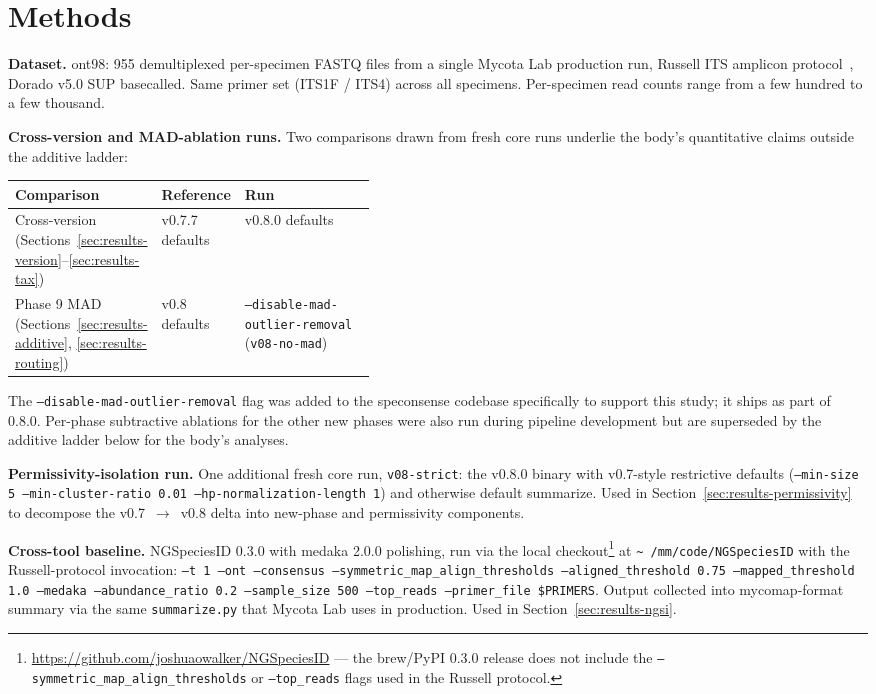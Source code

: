 \documentclass[11pt]{article}
\begin{document}
\section{Methods}
\label{sec:methods}

\textbf{Dataset.} ont98: 955 demultiplexed per-specimen FASTQ files from a
single Mycota Lab production run, Russell ITS amplicon
protocol~\cite{russell2023}, Dorado v5.0 SUP basecalled. Same primer set
(ITS1F / ITS4) across all specimens. Per-specimen read counts range from a
few hundred to a few thousand.

\textbf{Cross-version and MAD-ablation runs.} Two comparisons drawn
from fresh core runs underlie the body's quantitative claims outside
the additive ladder:

\begin{center}
\begin{tabular}{l l p{0.42\linewidth}}
\toprule
Comparison & Reference & Run \\
\midrule
Cross-version (Sections~\ref{sec:results-version}--\ref{sec:results-tax})
  & v0.7.7 defaults & v0.8.0 defaults \\
Phase 9 MAD (Sections~\ref{sec:results-additive}, \ref{sec:results-routing})
  & v0.8 defaults & \texttt{--disable-mad-outlier-removal} (\texttt{v08-no-mad}) \\
\bottomrule
\end{tabular}
\end{center}

The \texttt{--disable-mad-outlier-removal} flag was added to the
speconsense codebase specifically to support this study; it ships as
part of 0.8.0. Per-phase subtractive ablations for the other new phases
were also run during pipeline development but are superseded by the
additive ladder below for the body's analyses.

\textbf{Permissivity-isolation run.} One additional fresh core run,
\texttt{v08-strict}: the v0.8.0 binary with v0.7-style restrictive
defaults (\texttt{--min-size 5 --min-cluster-ratio 0.01
--hp-normalization-length 1}) and otherwise default summarize. Used in
Section~\ref{sec:results-permissivity} to decompose the v0.7~$\to$~v0.8
delta into new-phase and permissivity components.

\textbf{Cross-tool baseline.} NGSpeciesID 0.3.0 with medaka 2.0.0
polishing, run via the local
checkout\footnote{\url{https://github.com/joshuaowalker/NGSpeciesID} ---
the brew/PyPI 0.3.0 release does not include the
\texttt{--symmetric\_map\_align\_thresholds} or \texttt{--top\_reads}
flags used in the Russell protocol.} at \texttt{\textasciitilde
/mm/code/NGSpeciesID} with the Russell-protocol invocation:
\texttt{--t 1 --ont --consensus --symmetric\_map\_align\_thresholds
--aligned\_threshold 0.75 --mapped\_threshold 1.0 --medaka
--abundance\_ratio 0.2 --sample\_size 500 --top\_reads --primer\_file
\$PRIMERS}. Output collected into mycomap-format summary via the same
\texttt{summarize.py} that Mycota Lab uses in production. Used in
Section~\ref{sec:results-ngsi}.
\end{document}

